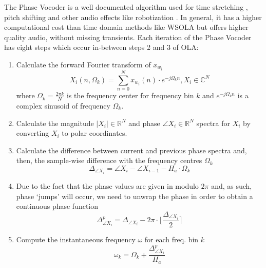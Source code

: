 \documentclass{sig-alternate}
\begin{document}
\begin{sloppypar}
The Phase Vocoder is a well documented \cite{phasevocoder:bernardini, dolsontutorial:phasevocoder, laroche:phasinessbusiness, phasevocoder:pitchshift, dafx:2nd} algorithm used for time stretching \cite{dolsontutorial:phasevocoder}, pitch shifting \cite{phasevocoder:pitchshift} and other audio effects like robotization \cite{dafx:2nd}. In general, it has a higher computational cost than time domain methods like WSOLA but offers higher quality audio, without missing transients. Each iteration of the Phase Vocoder has eight steps which occur in-between steps 2 and 3 of OLA:
\begin{enumerate}
	\item Calculate the forward Fourier transform of $x_{w_i}$
\begin{equation}
X_{i}(n, \Omega_{k}) = \sum_{n=0}^{N} x_{w_i}(n) \cdot e^{-j\Omega_{k}n}, X_{i} \in \mathbb{C}^N
\end{equation}
where $\Omega_{k} = \frac{2\pi k}{N}$ is the frequency center for frequency bin $k$ and $e^{-j\Omega_{k}n}$ is a complex sinusoid of frequency $\Omega_k$.

	\item Calculate the magnitude $|X_i|  \in \mathbb{R}^N$ and phase $\angle X_i  \in \mathbb{R}^N$ spectra for $X_i$ by converting $X_i$ to polar coordinates.

	\item Calculate the difference between current and previous phase spectra and, then, the sample-wise difference with the frequency centres $\Omega_{k}$ 
\begin{equation}
\Delta_{\angle X_i} = \angle X_{i} - \angle X_{i-1} - H_a \cdot \Omega_k
\end{equation}
	
	\item Due to the fact that the phase values are given in modulo $2\pi$ and, as such, phase `jumps' will occur, we need to unwrap the phase in order to obtain a continuous phase function 
\begin{equation}
\Delta^{p}_{\angle X_i} = \Delta_{\angle X_i} - 2\pi \cdot \lfloor \frac{\Delta_{\angle X_i}}{2} \rceil
\end{equation}

	\item Compute the instantaneous frequency $\omega$ for each freq. bin $k$
\begin{equation}
\omega_k = \Omega_k + \frac{\Delta^{p}_{\angle X_i}}{H_a}
\end{equation}


\end{enumerate}
\end{sloppypar}
\end{document}
